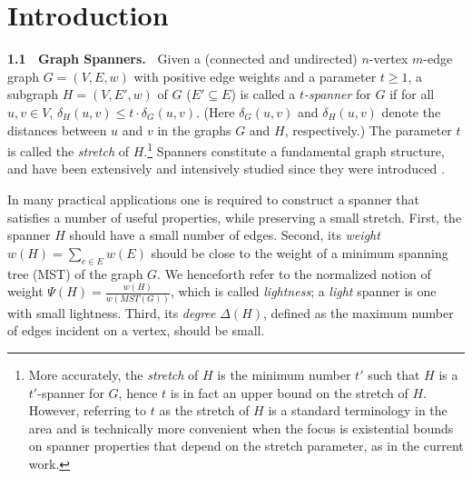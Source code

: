 \documentclass[11pt,letterpaper]{article}
\begin{document}
\section{Introduction}
\vspace{3pt}
{\bf 1.1~ Graph Spanners.~}
Given a (connected and undirected) $n$-vertex $m$-edge graph $G = (V,E,w)$ with positive edge weights and a parameter $t \ge 1$, a subgraph $H = (V,E',w)$ of $G$
($E' \subseteq E$) is called a \emph{$t$-spanner} for $G$ if for all $u,v \in V$, $\delta_H(u,v) \le t \cdot \delta_G(u,v)$.
(Here $\delta_G(u,v)$ and $\delta_H(u,v)$ denote the distances between $u$ and $v$ in the graphs $G$ and $H$, respectively.)
The parameter $t$ is called the \emph{stretch} of $H$.\footnote{More accurately, the \emph{stretch} of $H$ is the minimum number $t'$ such that $H$ is a $t'$-spanner for $G$, hence $t$ is in fact an upper bound on the stretch of $H$. However, referring to $t$ as the stretch of $H$ is a standard terminology in the area and is technically more convenient when the focus is existential bounds on spanner properties that depend on the stretch parameter, as in the current work.}
Spanners constitute a fundamental graph structure, and have been extensively and intensively studied since they were introduced \cite{PS89,PU89}.

In many practical applications one is required to construct a spanner that satisfies a number of useful properties, while preserving a small stretch.
First, the spanner $H$ should have a small number of edges.
Second, its \emph{weight} $w(H) = \sum_{e \in E} w(E)$ should be close to the weight of a minimum spanning tree (MST) of the graph $G$.
We henceforth refer to the normalized notion of weight $\Psi(H) = \frac{w(H)}{w(MST(G))}$, which is called \emph{lightness};
a \emph{light} spanner is one with small lightness.
Third, its \emph{degree} $\Delta(H)$, defined as the maximum number of edges incident on a vertex, should be small.
\end{document}
